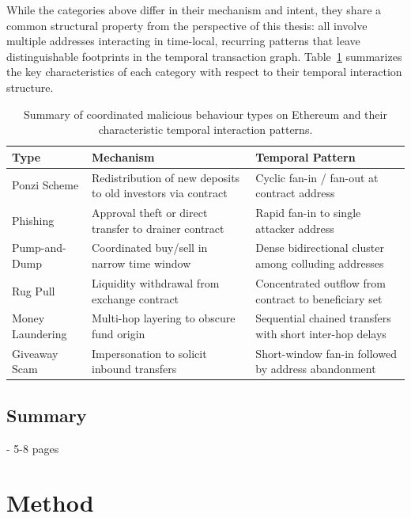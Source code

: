 \documentclass{thesisclass}
\begin{document}
\vspace{0.5em}
While the categories above differ in their mechanism and intent, they share a common structural property from the perspective of this thesis: all involve multiple addresses interacting in time-local, recurring patterns that leave distinguishable footprints in the temporal transaction graph. Table~\ref{tab:scam_types} summarizes the key characteristics of each category with respect to their temporal interaction structure.

\begin{table}[htbp]
\centering
\caption{Summary of coordinated malicious behaviour types on Ethereum and their characteristic temporal interaction patterns.}
\label{tab:scam_types}
\begin{tabular}{p{3.2cm} p{5.2cm} p{4.8cm}}
\toprule
\textbf{Type} & \textbf{Mechanism} & \textbf{Temporal Pattern} \\
\midrule
Ponzi Scheme     & Redistribution of new deposits to old investors via contract & Cyclic fan-in / fan-out at contract address \\
Phishing         & Approval theft or direct transfer to drainer contract         & Rapid fan-in to single attacker address \\
Pump-and-Dump    & Coordinated buy/sell in narrow time window                    & Dense bidirectional cluster among colluding addresses \\
Rug Pull         & Liquidity withdrawal from exchange contract                   & Concentrated outflow from contract to beneficiary set \\
Money Laundering & Multi-hop layering to obscure fund origin                     & Sequential chained transfers with short inter-hop delays \\
Giveaway Scam    & Impersonation to solicit inbound transfers                    & Short-window fan-in followed by address abandonment \\
\bottomrule
\end{tabular}
\end{table}


\section{Summary}

- 5-8 pages




\chapter{Method} 
\label{ch:method}
\end{document}
